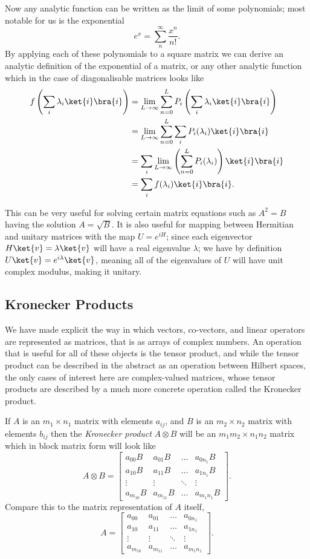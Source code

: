 Now any analytic function can be written as the limit of some polynomials; most notable for us is the exponential
\[e^x = \sum_n^\infty \frac{x^n}{n!}.\]
By applying each of these polynomials to a square matrix we can derive an analytic definition of the exponential of a matrix, or any other analytic function which in the case of diagonalisable matrices looks like
\begin{align*}
	f\left(\sum_i \lambda_i\ket{i}\bra{i}\right)
	&= \lim_{L \to \infty} \sum_{n=0}^L P_i\left(\sum_i \lambda_i\ket{i}\bra{i}\right)
	\\&= \lim_{L \to \infty} \sum_{n=0}^L \sum_i P_i(\lambda_i)\ket{i}\bra{i}
	\\&= \sum_i \lim_{L \to \infty} \left(\sum_{n=0}^L  P_i(\lambda_i)\right)\ket{i}\bra{i}
	\\&= \sum_i f(\lambda_i)\ket{i}\bra{i}.
\end{align*}

This can be very useful for solving certain matrix equations such as $A^2 = B$ having the solution $A = \sqrt{B}$. It is also useful for mapping between Hermitian and unitary matrices with the map $U = e^{iH}$; since each eigenvector $H\ket{v} = \lambda\ket{v}$ will have a real eigenvalue $\lambda$; we have by definition $U\ket{v} = e^{i\lambda}\ket{v}$, meaning all of the eigenvalues of $U$ will have unit complex modulus, making it unitary.

\subsection{Kronecker Products}
We have made explicit the way in which vectors, co-vectors, and linear operators are represented as matrices, that is as arrays of complex numbers. An operation that is useful for all of these objects is the tensor product, and while the tensor product can be described in the abstract as an operation between Hilbert spaces, the only cases of interest here are complex-valued matrices, whose tensor products are described by a much more concrete operation called the Kronecker product.

If $A$ is an $m_1 \times n_1$ matrix with elements $a_{ij}$, and $B$ is an $m_2 \times n_2$ matrix with elements $b_{ij}$ then the \emph{Kronecker product} $A \otimes B$ will be an $m_1m_2 \times n_1n_2$ matrix which in block matrix form will look like
\[
A\otimes B = \left[\begin{matrix}
		a_{00}B & a_{01}B & \dots & a_{0n_1}B\\
		a_{10}B & a_{11}B & \dots & a_{1n_1}B\\
		\vdots & \vdots & \ddots & \vdots\\
		a_{m_10}B & a_{m_11}B & \dots & a_{m_1n_1}B
	\end{matrix}\right].
\]
Compare this to the matrix representation of $A$ itself,
\[
	A = \left[\begin{matrix}
	a_{00} & a_{01} & \dots & a_{0n_1}\\
	a_{10} & a_{11} & \dots & a_{1n_1}\\
	\vdots & \vdots & \ddots & \vdots\\
	a_{m_10} & a_{m_11} & \dots & a_{m_1n_1}
\end{matrix}\right].
\]

